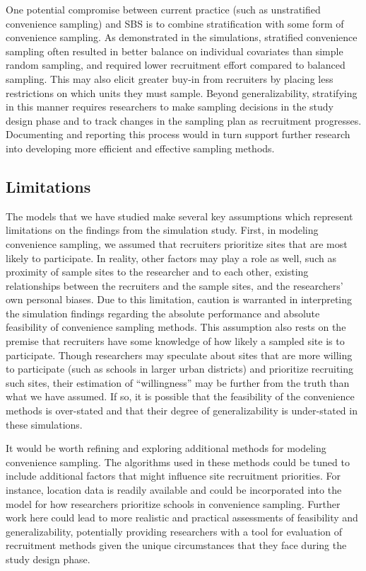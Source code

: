 \documentclass[
  english,
  man,floatsintext]{apa6}
\begin{document}
One potential compromise between current practice (such as unstratified convenience sampling) and SBS is to combine stratification with some form of convenience sampling. As demonstrated in the simulations, stratified convenience sampling often resulted in better balance on individual covariates than simple random sampling, and required lower recruitment effort compared to balanced sampling. This may also elicit greater buy-in from recruiters by placing less restrictions on which units they must sample.
Beyond generalizability, stratifying in this manner requires researchers to make sampling decisions in the study design phase and to track changes in the sampling plan as recruitment progresses. Documenting and reporting this process would in turn support further research into developing more efficient and effective sampling methods.

\hypertarget{limitations}{%
\subsection*{Limitations}\label{limitations}}

The models that we have studied make several key assumptions which represent limitations on the findings from the simulation study. First, in modeling convenience sampling, we assumed that recruiters prioritize sites that are most likely to participate. In reality, other factors may play a role as well, such as proximity of sample sites to the researcher and to each other, existing relationships between the recruiters and the sample sites, and the researchers' own personal biases.
Due to this limitation, caution is warranted in interpreting the simulation findings regarding the absolute performance and absolute feasibility of convenience sampling methods.
This assumption also rests on the premise that recruiters have some knowledge of how likely a sampled site is to participate. Though researchers may speculate about sites that are more willing to participate (such as schools in larger urban districts) and prioritize recruiting such sites, their estimation of ``willingness'' may be further from the truth than what we have assumed. If so, it is possible that the feasibility of the convenience methods is over-stated and that their degree of generalizability is under-stated in these simulations.

It would be worth refining and exploring additional methods for modeling convenience sampling. The algorithms used in these methods could be tuned to include additional factors that might influence site recruitment priorities. For instance, location data is readily available and could be incorporated into the model for how researchers prioritize schools in convenience sampling. Further work here could lead to more realistic and practical assessments of feasibility and generalizability, potentially providing researchers with a tool for evaluation of recruitment methods given the unique circumstances that they face during the study design phase.
\end{document}
